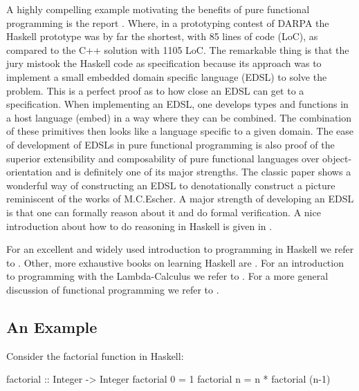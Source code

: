 A highly compelling example motivating the benefits of pure functional programming is the report \cite{hudak_haskell_1994}. Where, in a prototyping contest of DARPA the Haskell prototype was by far the shortest, with 85 lines of code (LoC), as compared to the C++ solution with 1105 LoC. The remarkable thing is that the jury mistook the Haskell code as specification because its approach was to implement a small embedded domain specific language (EDSL) to solve the problem. This is a perfect proof as to how close an EDSL can get to a specification. When implementing an EDSL, one develops types and functions in a host language (embed) in a way where they can be combined. The combination of these primitives then looks like a language specific to a given domain. The ease of development of EDSLs in pure functional programming is also proof of the superior extensibility and composability of pure functional languages over object-orientation and is definitely one of its major strengths. The classic paper \cite{henderson_functional_1982} shows a wonderful way of constructing an EDSL to denotationally construct a picture reminiscent of the works of M.C.Escher. A major strength of developing an EDSL is that one can formally reason about it and do formal verification. A nice introduction about how to do reasoning in Haskell is given in \cite{hutton_tutorial_1999}.

For an excellent and widely used introduction to programming in Haskell we refer to \cite{hutton_programming_2016}. Other, more exhaustive books on learning Haskell are \cite{allen_haskell_2016, lipovaca_learn_2011}. For an introduction to programming with the Lambda-Calculus we refer to \cite{michaelson_introduction_2011}. For a more general discussion of functional programming we refer to \cite{hudak_history_2007,hughes_why_1989,maclennan_functional_1990}.

\subsection{An Example}
Consider the factorial function in Haskell:
\begin{HaskellCode}
factorial :: Integer -> Integer
factorial 0 = 1
factorial n = n * factorial (n-1)
\end{HaskellCode}

